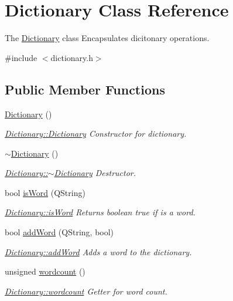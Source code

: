 \hypertarget{class_dictionary}{\section{Dictionary Class Reference}
\label{class_dictionary}
}


The \hyperlink{class_dictionary}{Dictionary} class Encapsulates dicitonary operations.  




{\ttfamily \#include $<$dictionary.\-h$>$}

\subsection*{Public Member Functions}
\begin{DoxyCompactItemize}
\item 
\hyperlink{class_dictionary_aee8d612bc9d323c38faba045ba384b8b}{Dictionary} ()
\begin{DoxyCompactList}\small\item\em \hyperlink{class_dictionary_aee8d612bc9d323c38faba045ba384b8b}{Dictionary\-::\-Dictionary} Constructor for dictionary. \end{DoxyCompactList}\item 
\hyperlink{class_dictionary_aa36f24073d9c9001768517aa2322cb82}{$\sim$\-Dictionary} ()
\begin{DoxyCompactList}\small\item\em \hyperlink{class_dictionary_aa36f24073d9c9001768517aa2322cb82}{Dictionary\-::$\sim$\-Dictionary} Destructor. \end{DoxyCompactList}\item 
bool \hyperlink{class_dictionary_afe2588ce04f6ad733c51df58a8d0d96b}{is\-Word} (Q\-String)
\begin{DoxyCompactList}\small\item\em \hyperlink{class_dictionary_afe2588ce04f6ad733c51df58a8d0d96b}{Dictionary\-::is\-Word} Returns boolean true if is a word. \end{DoxyCompactList}\item 
bool \hyperlink{class_dictionary_a6bf35992b5b44b610b830c2361c67c3e}{add\-Word} (Q\-String, bool)
\begin{DoxyCompactList}\small\item\em \hyperlink{class_dictionary_a6bf35992b5b44b610b830c2361c67c3e}{Dictionary\-::add\-Word} Adds a word to the dictionary. \end{DoxyCompactList}\item 
unsigned \hyperlink{class_dictionary_a327b99a18977f2b898adfd496426cf27}{wordcount} ()
\begin{DoxyCompactList}\small\item\em \hyperlink{class_dictionary_a327b99a18977f2b898adfd496426cf27}{Dictionary\-::wordcount} Getter for word count. \end{DoxyCompactList}\end{DoxyCompactItemize}
